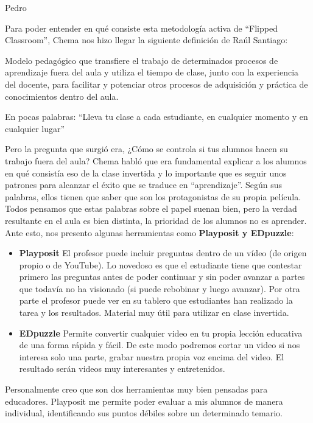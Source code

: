\begin{opin}{\pedrocolor}{Pedro}
\begin{leftbar}{\pedrocolor}
Para poder entender en qué consiste esta metodología activa de “Flipped Classroom”, Chema nos hizo llegar la siguiente definición de Raúl Santiago:

Modelo pedagógico que transfiere el trabajo de determinados procesos de aprendizaje  fuera del aula y utiliza el tiempo de clase, junto con la experiencia del docente, para facilitar y potenciar otros procesos de adquisición y práctica de conocimientos dentro del aula. 

En pocas palabras: “Lleva tu clase a cada estudiante, en cualquier momento y en cualquier lugar”

Pero la pregunta que surgió era, ¿Cómo se controla si tus alumnos hacen su trabajo fuera del aula? Chema habló que era fundamental explicar a los alumnos en qué consistía eso de la clase invertida y lo importante que es seguir unos patrones  para alcanzar el éxito que se traduce en “aprendizaje”. Según sus palabras, ellos tienen que saber que son los protagonistas de su propia película. Todos pensamos que estas palabras sobre el papel suenan bien, pero la verdad resultante en el aula es bien distinta, la prioridad de los alumnos no es aprender. Ante esto, nos presento algunas herramientas como \textbf{Playposit y EDpuzzle}:

\begin{itemize}

\item  \textbf{Playposit} El profesor puede incluir preguntas dentro de un vídeo (de origen propio o de YouTube). Lo novedoso es que el estudiante tiene que contestar primero las preguntas antes de poder continuar y sin poder avanzar a partes que todavía no ha visionado (si puede rebobinar y luego avanzar). Por otra parte el profesor puede ver en su tablero que estudiantes han realizado la tarea y los resultados. Material muy útil para utilizar en clase invertida. 

\item  \textbf{EDpuzzle} Permite convertir cualquier video en tu propia lección educativa de una forma rápida y fácil. De este modo podremos cortar un video si nos interesa solo una parte, grabar nuestra propia voz encima del video.  El resultado serán videos muy interesantes y entretenidos. 
\end{itemize}

Personalmente creo que son dos herramientas muy bien pensadas para educadores. Playposit me permite poder evaluar a mis alumnos de manera individual, identificando sus puntos débiles sobre un determinado temario.


\end{leftbar}
\end{opin}
